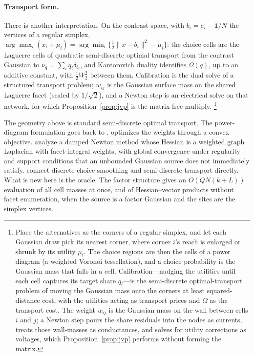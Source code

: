 \documentclass[12pt]{article}
\theoremstyle{remark}
\begin{document}
\paragraph{Transport form.}

There is another interpretation. On the contrast space, with $b_i = e_i - \mathbf{1}/N$ the vertices of
a regular simplex, $\arg\max_i (x_i + \mu_i) = \arg\min_i
\{\tfrac12 \|x - b_i\|^2 - \mu_i\}$: the choice cells are the
Laguerre cells of quadratic semi-discrete optimal transport from the
contrast Gaussian to $\nu_q = \sum_i q_i \delta_{b_i}$, and
Kantorovich duality identifies $\Omega(q)$, up to an additive constant,
with $\tfrac12 W_2^2$ between them. Calibration is the dual solve of a
structured transport problem; $w_{ij}$ is the Gaussian surface mass on
the shared Laguerre facet (scaled by $1/\sqrt2$), and a Newton step is
an electrical solve on that network, for which
Proposition~\ref{prop:jvp} is the matrix-free multiply.%
\footnote{Place the alternatives as the corners of a
regular simplex, and let each Gaussian draw pick its nearest corner,
where corner $i$'s reach is enlarged or shrunk by its utility $\mu_i$.
The choice regions are then the cells of a power diagram (a weighted
Voronoi tessellation), and a choice probability is the Gaussian mass
that falls in a cell. Calibration---nudging the utilities until each
cell captures its target share $q_i$---is the semi-discrete
optimal-transport problem of moving the Gaussian mass onto the corners
at least squared-distance cost, with the utilities acting as transport
prices and $\Omega$ as the transport cost. The weight $w_{ij}$ is the
Gaussian mass on the wall between cells $i$ and $j$; a Newton step pours
the share residuals into the nodes as currents, treats those
wall-masses as conductances, and solves for utility corrections as
voltages, which Proposition~\ref{prop:jvp} performs without forming the
matrix.}

The geometry above is standard semi-discrete optimal transport. The
power-diagram formulation goes back to \citet{aurenhammer1998}.
\citet{levy2015} optimizes the weights through a convex objective.
\citet{kmt2019} analyze a damped Newton method whose Hessian is a
weighted graph Laplacian with facet-integral weights, with global
convergence under regularity and support conditions that an unbounded
Gaussian source does not immediately satisfy. \citet{taskesen2023}
connect discrete-choice smoothing and semi-discrete transport directly.
What is new here is the oracle. The factor structure gives an
$O(QN(k+L))$ evaluation of all cell masses at once, and of
Hessian--vector products without facet enumeration, when the source is
a factor Gaussian and the sites are the simplex vertices.
\end{document}
